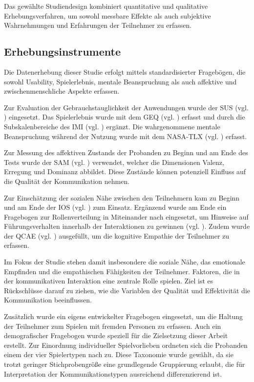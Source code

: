 Das gewählte Studiendesign kombiniert quantitative und qualitative Erhebungsverfahren, um sowohl messbare Effekte als auch subjektive Wahrnehmungen und Erfahrungen der Teilnehmer zu erfassen.

\subsection{Erhebungsinstrumente}

Die Datenerhebung dieser Studie erfolgt mittels standardisierter Fragebögen, die sowohl Usability, Spielerlebnis, mentale Beanspruchung als auch affektive und zwischenmenschliche Aspekte erfassen.

Zur Evaluation der Gebrauchstauglichkeit der Anwendungen wurde der \ac{SUS} (vgl. \citealp{brooke_sus_1995}) eingesetzt. Das Spielerlebnis wurde mit dem \ac{GEQ} (vgl. \citealp{ijsselsteijn_game_2013}) erfasst und durch die Subskalenbereiche  des \ac{IMI} (vgl. \citealp{mcauley_psychometric_1989}) ergänzt. Die wahrgenommene mentale Beanspruchung während der Nutzung wurde mit dem \ac{NASA-TLX} (vgl. \citealp{hart_nasa-task_2006}) erfasst.

Zur Messung des affektiven Zustands der Probanden zu Beginn und am Ende des Tests wurde der \ac{SAM} (vgl. \citealp{russell_evidence_1977}) verwendet, welcher die Dimensionen Valenz, Erregung und Dominanz abbildet. Diese Zustände können potenziell Einfluss auf die Qualität der Kommunikation nehmen.

Zur Einschätzung der sozialen Nähe zwischen den Teilnehmern kam  zu Beginn und am Ende der \ac{IOS} (vgl. \citealp{gachter_measuring_2015}) zum Einsatz. Ergänzend wurde am Ende ein Fragebogen zur Rollenverteilung in Miteinander nach \cite{emmerich_game_2016} eingesetzt, um Hinweise auf Führungsverhalten innerhalb der Interaktionen zu gewinnen (vgl. \citealp[S. 5]{emmerich_game_2016}). Zudem wurde der \ac{QCAE} (vgl. \citealp{reniers_qcae_2011}) ausgefüllt, um die kognitive Empathie der Teilnehmer zu erfassen.

Im Fokus der Studie stehen damit insbesondere die soziale Nähe, das emotionale Empfinden und die empathischen Fähigkeiten der Teilnehmer. Faktoren, die in der kommunikativen Interaktion eine zentrale Rolle spielen. Ziel ist es Rückschlüsse darauf zu ziehen, wie die Variablen der Qualität und Effektivität die Kommunikation beeinflussen.

Zusätzlich wurde ein eigens entwickelter Fragebogen eingesetzt, um die Haltung der Teilnehmer zum Spielen mit fremden Personen zu erfassen. Auch ein demografischer Fragebogen wurde speziell für die Zielsetzung dieser Arbeit erstellt. Zur Einordnung individueller Spielvorlieben ordneten sich die Probanden einem der vier Spielertypen nach  \cite{bartle_hearts_1996} zu. Diese Taxonomie wurde gewählt, da sie trotzt geringer Stichprobengröße eine grundlegende Gruppierung erlaubt, die für Interpretation der Kommunikationstypen ausreichend differenzierend ist.

